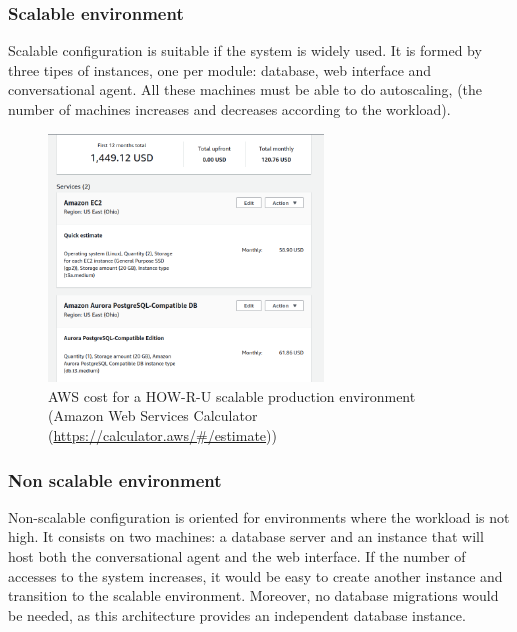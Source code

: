 \documentclass[12pt,english]{article}
\begin{document}
\subsubsection{Scalable environment}

Scalable configuration is suitable if the system is widely used. It is formed by three tipes of instances, one per module: database, web interface and conversational agent. All these machines must be able to do autoscaling, (the number of machines increases and decreases according to the workload).

\begin{figure}[H]
  \centering
  \includegraphics[width=0.65\textwidth]{cost.png}
  \caption{AWS cost for a HOW-R-U scalable production environment (Amazon Web Services Calculator (\href{https://calculator.aws/\#/estimate}{https://calculator.aws/\#/estimate}))}
\end{figure}

\subsubsection{Non scalable environment}

Non-scalable configuration is oriented for environments where the workload is not high. It consists on two machines: a database server and an instance that will host both the conversational agent and the web interface. If the number of accesses to the system increases, it would be easy to create another instance and transition to the scalable environment. Moreover, no database migrations would be needed, as this architecture provides an independent database instance.
\end{document}
